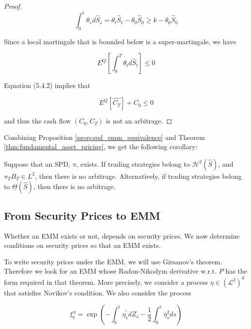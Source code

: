 \documentclass[\topdir/lecture\_notes.tex]{subfiles}
\begin{document}
\begin{proof}
\begin{equation*}
\int_{0}^{t} \theta_{s} d \hat{S}_{s}=\theta_{t} \hat{S}_{t}-\theta_{0} \hat{S}_{0} \geq k-\theta_{0} \hat{S}_{0}
\end{equation*}

Since a local martingale that is bounded below is a super-martingale, we have

\begin{equation*}
E^{Q}\left[\int_{0}^{T} \theta_{t} d \hat{S}_{t}\right] \leq 0
\end{equation*}

Equation (5.4.2) implies that

\begin{equation*}
E^{Q}\left[\hat{C_{T}}\right]+C_{0} \leq 0
\end{equation*}

and thus the cash flow $\left(C_{0}, C_{T}\right)$ is not an arbitrage.
\end{proof}

Combining Proposition \ref{prop:spd_emm_equivalence} and Theorem \ref{thm:fundamental_asset_pricing}, we get the following corollary:

\begin{corollary}\label{cor:no_arbitrage_conditions}
Suppose that an SPD, $\pi$, exists. If trading strategies belong to $\mathcal{H}^{2}(\hat{S})$, and $\pi_{T} B_{T} \in L^{2}$, then there is no arbitrage. Alternatively, if trading strategies belong to $\underline{\Theta}(\hat{S})$, then there is no arbitrage.
\end{corollary}

\subsection{From Security Prices to EMM}
Whether an EMM exists or not, depends on security prices. We now determine conditions on security prices so that an EMM exists.

To write security prices under the EMM, we will use Girsanov's theorem. Therefore we look for an EMM whose Radon-Nikodym derivative w.r.t. $P$ has the form required in that theorem. More precisely, we consider a process $\eta \in\left(\mathcal{L}^{2}\right)^{d}$ that satisfies Novikov's condition. We also consider the process

\begin{equation*}
\xi_{t}^{\eta}=\exp \left(-\int_{0}^{t} \eta_{s}^{\prime} d Z_{s}-\frac{1}{2} \int_{0}^{t} \eta_{s}^{2} d s\right)
\end{equation*}
\end{document}
